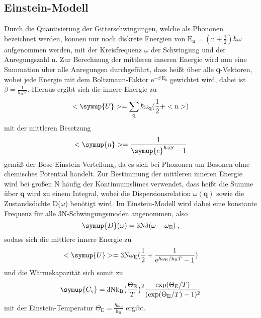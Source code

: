 \subsection{Einstein-Modell}
Durch die Quantisierung der Gitterschwingungen, welche als Phononen bezeichnet
werden, können nur noch diskrete Energien von $ \text{E}_{\text{n}}=(\text{n}+\frac{1}{2})
\hbar \omega $ aufgenommen werden, mit der Kreisfrequenz $\omega$ der Schwingung
und der Anregungszahl n. Zur Berechnung der mittleren inneren Energie wird nun eine Summation
über alle Anregungen durchgeführt, dass heißt über alle
\textbf{q}-Vektoren, wobei jede Energie mit dem Boltzmann-Faktor
$\text{e}^{-\beta \:\text{E}_{\text{n}}}$ gewichtet wird, dabei ist
$\beta= \frac{1}{\text{k}_{\text{B}}\text{T}}$.
Hieraus ergibt sich die innere Energie zu
\begin{equation}
  <\symup{U}> = \sum_{\textbf{q}}\hbar\omega_{\textbf{q}}(\frac{1}{2}+<\text{n}>)
  \label{eqn:Uqm}
\end{equation}
mit der mittleren Besetzung
\begin{equation}
  <\symup{n}> =  \frac{1}{\symup{e}^{\hbar\omega\beta}-1}
  \label{eqn:boseeinstein}
\end{equation}
gemäß der Bose-Einstein Verteilung, da es sich bei Phononen um Bosonen ohne
chemisches Potential handelt.
Zur Bestimmung der mittleren inneren Energie wird bei großen N häufig der Kontinuumslimes
verwendet, dass heißt die Summe über $\textbf{q}$ wird zu einem Integral, wobei die
Dispersionsrelation $\omega(\textbf{q})$ sowie die Zustandsdichte D($\omega$)
benötigt wird.
Im Einstein-Modell wird dabei eine konstante Frequenz
für alle 3N-Schwingungsmoden angenommen, also
\begin{equation}
  \symup{D}(\omega) = 3\text{N}\delta(\omega-\omega_{\text{E}}) \: ,
  \label{eqn:zdeinst}
\end{equation}
sodass sich die mittlere innere Energie zu
\begin{equation}
  <\symup{U}> = 3\text{N}\omega_{\text{E}}(\frac{1}{2}+\frac{1}{\text{e}^{\hbar\omega_{\text{E}}/
  \text{k}_{\text{B}}T}-1})
  \label{eqn:Uein}
\end{equation}
und die Wärmekapazität sich somit zu
\begin{equation}
  \symup{C_{\text{v}}} = 3\text{N}\text{k}_{\text{B}}\bigl(\frac{\Theta_{\text{E}}}{T}\bigr)^2
  \frac{\text{exp}(\Theta_{\text{E}}/T)}{(\text{exp}(\Theta_{\text{E}}/T)-1)^2}
  \label{eqn:Cein}
\end{equation}
mit der Einstein-Temperatur
$\Theta_{\text{E}} = \frac{\hbar\omega_{\text{E}}}{\text{k}_{\text{B}}}$ ergibt.
